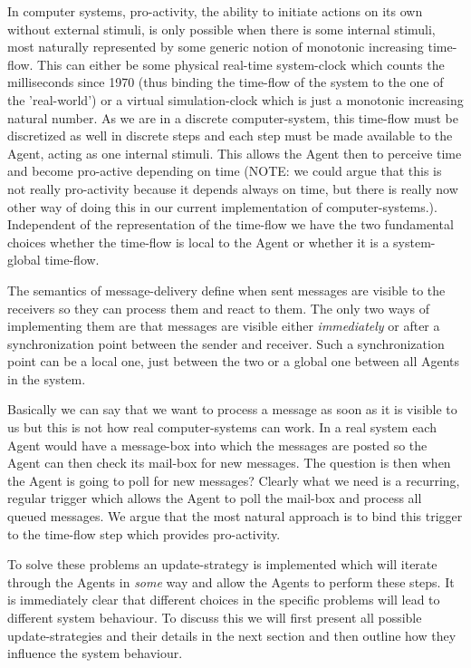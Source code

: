 In computer systems, pro-activity, the ability to initiate actions on its own without external stimuli, is only possible when there is some internal stimuli, most naturally represented by some generic notion of monotonic increasing time-flow. This can either be some physical real-time system-clock which counts the milliseconds since 1970 (thus binding the time-flow of the system to the one of the 'real-world') or a virtual simulation-clock which is just a monotonic increasing natural number. As we are in a discrete computer-system, this time-flow must be discretized as well in discrete steps and each step must be made available to the Agent, acting as one internal stimuli. This allows the Agent then to perceive time and become pro-active depending on time (NOTE: we could argue that this is not really pro-activity because it depends always on time, but there is really now other way of doing this in our current implementation of computer-systems.). Independent of the representation of the time-flow we have the two fundamental choices whether the time-flow is local to the Agent or whether it is a system-global time-flow.

\medskip 

The semantics of message-delivery define when sent messages are visible to the receivers so they can process them and react to them. The only two ways of implementing them are that messages are visible either \textit{immediately} or after a synchronization point between the sender and receiver. Such a synchronization point can be a local one, just between the two or a global one between all Agents in the system.

\medskip 

Basically we can say that we want to process a message as soon as it is visible to us but this is not how real computer-systems can work. In a real system each Agent would have a message-box into which the messages are posted so the Agent can then check its mail-box for new messages. The question is then when the Agent is going to poll for new messages? Clearly what we need is a recurring, regular trigger which allows the Agent to poll the mail-box and process all queued messages. We argue that the most natural approach is to bind this trigger to the time-flow step which provides pro-activity.

\medskip 

To solve these problems an update-strategy is implemented which will iterate through the Agents in \textit{some} way and allow the Agents to perform these steps. It is immediately clear that different choices in the specific problems will lead to different system behaviour. To discuss this we will first present all possible update-strategies and their details in the next section and then outline how they influence the system behaviour.